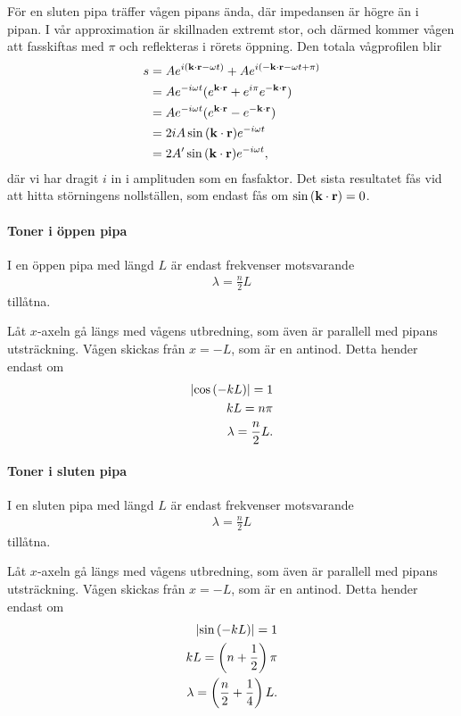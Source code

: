 \deriv
För en sluten pipa träffer vågen pipans ända, där impedansen är högre än i pipan. I vår approximation är skillnaden extremt stor, och därmed kommer vågen att fasskiftas med $\pi$ och reflekteras i rörets öppning. Den totala vågprofilen blir
\begin{align*}
	s &= Ae^{i(\vect{k}\cdot\vect{r} - \omega t)} + Ae^{i(-\vect{k}\cdot\vect{r} - \omega t + \pi)} \\
	  &= Ae^{-i\omega t}(e^{\vect{k}\cdot\vect{r}} + e^{i\pi}e^{-\vect{k}\cdot\vect{r}}) \\
	  &= Ae^{-i\omega t}(e^{\vect{k}\cdot\vect{r}} - e^{-\vect{k}\cdot\vect{r}}) \\
	  &= 2iA\sin{(\vect{k}\cdot\vect{r})}e^{-i\omega t}\\
	  &= 2A'\sin{(\vect{k}\cdot\vect{r})}e^{-i\omega t},
\end{align*}
där vi har dragit $i$ in i amplituden som en fasfaktor. Det sista resultatet fås vid att hitta störningens nollställen, som endast fås om $\sin{(\vect{k}\cdot\vect{r})} = 0$.

\paragraph{Toner i öppen pipa}
I en öppen pipa med längd $L$ är endast frekvenser motsvarande
\begin{align*}
	\lambda = \frac{n}{2}L
\end{align*}
tillåtna.

\deriv
Låt $x$-axeln gå längs med vågens utbredning, som även är parallell med pipans utsträckning. Vågen skickas från $x = -L$, som är en antinod. Detta hender endast om
\begin{align*}
	\abs{\cos{(-kL)}} = 1 \\
	kL = n\pi \\
	\lambda = \frac{n}{2}L.
\end{align*}

\paragraph{Toner i sluten pipa}
I en sluten pipa med längd $L$ är endast frekvenser motsvarande
\begin{align*}
	\lambda = \frac{n}{2}L
\end{align*}
tillåtna.

\deriv
Låt $x$-axeln gå längs med vågens utbredning, som även är parallell med pipans utsträckning. Vågen skickas från $x = -L$, som är en antinod. Detta hender endast om
\begin{align*}
	\abs{\sin{(-kL)}} = 1 \\
	kL = \left(n+ \frac{1}{2}\right)\pi \\
	\lambda = \left(\frac{n}{2} + \frac{1}{4}\right)L.
\end{align*}

